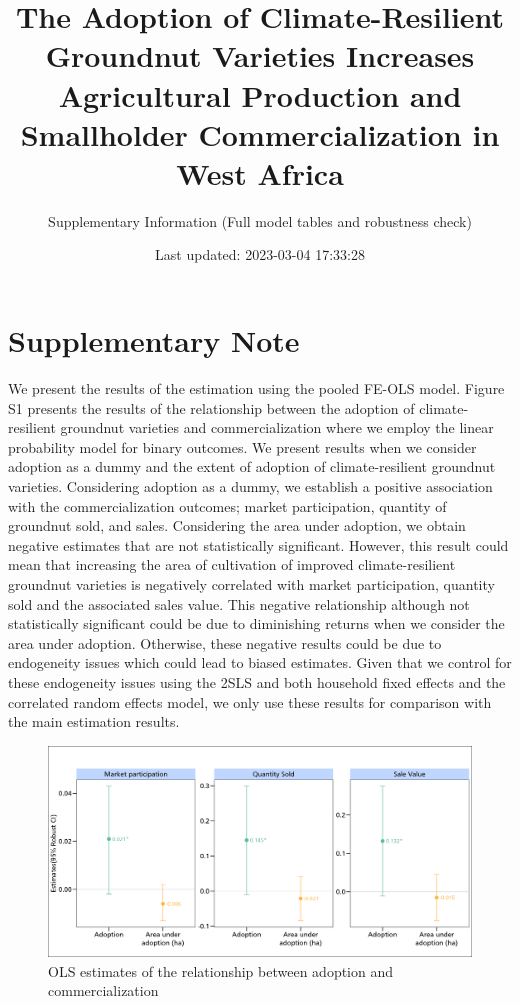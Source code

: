 \documentclass[
]{article}
\title{The Adoption of Climate-Resilient Groundnut Varieties Increases Agricultural Production and Smallholder Commercialization in West Africa}
\subtitle{Supplementary Information (Full model tables and robustness check)}
\date{Last updated: 2023-03-04 17:33:28}
\begin{document}
\maketitle

\newpage
\tableofcontents
\newpage
\listoftables
\newpage

\newpage

\newpage

\hypertarget{supplementary-note}{%
\section{Supplementary Note}\label{supplementary-note}}

We present the results of the estimation using the pooled FE-OLS model. Figure S1 presents the results of the relationship between the adoption of climate-resilient groundnut varieties and commercialization where we employ the linear probability model for binary outcomes. We present results when we consider adoption as a dummy and the extent of adoption of climate-resilient groundnut varieties. Considering adoption as a dummy, we establish a positive association with the commercialization outcomes; market participation, quantity of groundnut sold, and sales. Considering the area under adoption, we obtain negative estimates that are not statistically significant. However, this result could mean that increasing the area of cultivation of improved climate-resilient groundnut varieties is negatively correlated with market participation, quantity sold and the associated sales value. This negative relationship although not statistically significant could be due to diminishing returns when we consider the area under adoption. Otherwise, these negative results could be due to endogeneity issues which could lead to biased estimates. Given that we control for these endogeneity issues using the 2SLS and both household fixed effects and the correlated random effects model, we only use these results for comparison with the main estimation results.

\begin{figure}[htbp]
\centering
\includegraphics[width=\textwidth]{figures/fig_SM1.png}
\caption{OLS estimates of the relationship between adoption and commercialization}
\end{figure}
\end{document}
